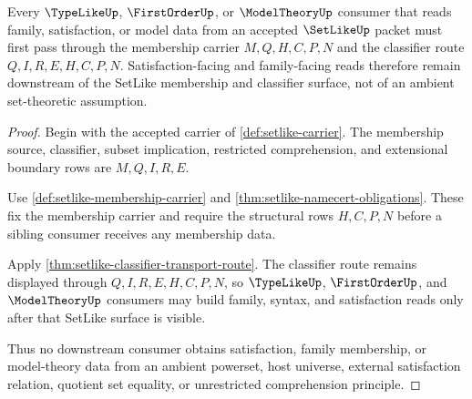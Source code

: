 \begin{theorem}
\label{thm:setlike-typelike-modeltheory-handoff}
Every $\TypeLikeUp$, $\FirstOrderUp$, or $\ModelTheoryUp$ consumer that reads family, satisfaction, or model data from an accepted $\SetLikeUp$ packet must first pass through the membership carrier $M,Q,H,C,P,N$ and the classifier route $Q,I,R,E,H,C,P,N$. Satisfaction-facing and family-facing reads therefore remain downstream of the SetLike membership and classifier surface, not of an ambient set-theoretic assumption.
\end{theorem}
\begin{proof}
Begin with the accepted carrier of \autoref{def:setlike-carrier}. The membership source, classifier, subset implication, restricted comprehension, and extensional boundary rows are $M,Q,I,R,E$.

Use \autoref{def:setlike-membership-carrier} and \autoref{thm:setlike-namecert-obligations}. These fix the membership carrier and require the structural rows $H,C,P,N$ before a sibling consumer receives any membership data.

Apply \autoref{thm:setlike-classifier-transport-route}. The classifier route remains displayed through $Q,I,R,E,H,C,P,N$, so $\TypeLikeUp$, $\FirstOrderUp$, and $\ModelTheoryUp$ consumers may build family, syntax, and satisfaction reads only after that SetLike surface is visible.

Thus no downstream consumer obtains satisfaction, family membership, or model-theory data from an ambient powerset, host universe, external satisfaction relation, quotient set equality, or unrestricted comprehension principle.
\end{proof}

